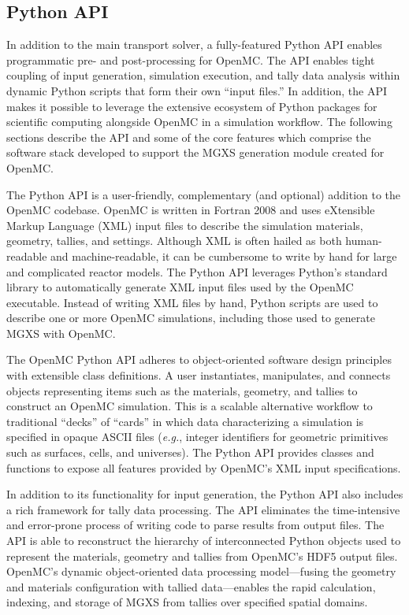 \subsection{Python API}
\label{subsec:pyapi}

In addition to the main transport solver, a fully-featured Python API enables programmatic pre- and post-processing for OpenMC\cite{boyd2016bigdata}. The API enables tight coupling of input generation, simulation execution, and tally data analysis within dynamic Python scripts that form their own ``input files.'' In addition, the API makes it possible to leverage the extensive ecosystem of Python packages for scientific computing alongside OpenMC in a simulation workflow. The following sections describe the API and some of the core features which comprise the software stack developed to support the MGXS generation module created for OpenMC.

The Python API is a user-friendly, complementary (and optional) addition to the OpenMC codebase. OpenMC is written in Fortran 2008 and uses eXtensible Markup Language (XML) input files to describe the simulation materials, geometry, tallies, and settings. Although XML is often hailed as both human-readable and machine-readable, it can be cumbersome to write by hand for large and complicated reactor models. The Python API leverages Python's standard library to automatically generate XML input files used by the OpenMC executable. Instead of writing XML files by hand, Python scripts are used to describe one or more OpenMC simulations, including those used to generate MGXS with OpenMC.

The OpenMC Python API adheres to object-oriented software design principles with extensible class definitions. A user instantiates, manipulates, and connects objects representing items such as the materials, geometry, and tallies to construct an OpenMC simulation. This is a scalable alternative workflow to traditional ``decks'' of ``cards'' in which data characterizing a simulation is specified in opaque ASCII files (\textit{e.g.}, integer identifiers for geometric primitives such as surfaces, cells, and universes). The Python API provides classes and functions to expose all features provided by OpenMC's XML input specifications.

In addition to its functionality for input generation, the Python API also includes a rich framework for tally data processing. The API eliminates the time-intensive and error-prone process of writing code to parse results from output files. The API is able to reconstruct the hierarchy of interconnected Python objects used to represent the materials, geometry and tallies from OpenMC's HDF5 output files. OpenMC's dynamic object-oriented data processing model---fusing the geometry and materials configuration with tallied data---enables the rapid calculation, indexing, and storage of MGXS from tallies over specified spatial domains.

